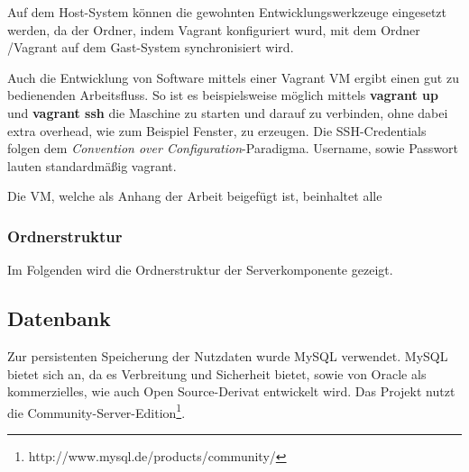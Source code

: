 Auf dem Host-System können die gewohnten Entwicklungswerkzeuge eingesetzt werden, da der Ordner, indem Vagrant konfiguriert wurd, mit dem Ordner /Vagrant auf dem Gast-System synchronisiert wird. 

Auch die Entwicklung von Software mittels einer Vagrant VM ergibt einen gut zu bedienenden Arbeitsfluss. So ist es beispielsweise möglich mittels \textbf{vagrant up} und \textbf{vagrant ssh} die Maschine zu starten und darauf zu verbinden, ohne dabei extra overhead, wie zum Beispiel Fenster, zu erzeugen. Die SSH-Credentials folgen dem \textit{Convention over Configuration}-Paradigma. Username, sowie Passwort lauten standardmäßig vagrant. 

Die VM, welche als Anhang der Arbeit beigefügt ist, beinhaltet alle 

\subsubsection{Ordnerstruktur}
Im Folgenden wird die Ordnerstruktur der Serverkomponente gezeigt. 

\subsection{Datenbank}

Zur persistenten Speicherung der Nutzdaten wurde MySQL verwendet. MySQL bietet sich an, da es Verbreitung und Sicherheit bietet, sowie von Oracle als kommerzielles, wie auch Open Source-Derivat entwickelt wird. Das Projekt nutzt die Community-Server-Edition\footnote{http://www.mysql.de/products/community/}. 

